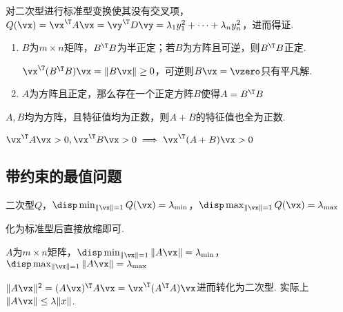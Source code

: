 \begin{analysis}
对二次型进行标准型变换使其没有交叉项，$Q(\vx)=\vx^\T A\vx=\vy^\T D\vy=\lambda_1y_1^2+\cdots+\lambda_ny_n^2$，进而得证.
\end{analysis}
\begin{proposition}
\begin{enumerate}
\itemsep -3pt
\item $B$为$m\times n$矩阵，$B^\T B$为半正定；若$B$为方阵且可逆，则$B^\T B$正定.
\begin{analysis}
$\vx^\T (B^\T B)\vx=\|B\vx\|\geq 0$，可逆则$B\vx=\vzero$只有平凡解.
\end{analysis}
\item $A$为方阵且正定，那么存在一个正定方阵$B$使得$A=B^\T B$
\end{enumerate}
\end{proposition}
\begin{proposition}
$A,B$均为方阵，且特征值均为正数，则$A+B$的特征值也全为正数.
\end{proposition}
\begin{analysis}
$\vx^\T A\vx>0,\vx^\T B\vx>0\implies\vx^\T (A+B)\vx>0$
\end{analysis}

\subsection{带约束的最值问题}
\begin{theorem}
二次型$Q$，$\disp\min_{\|\vx\|=1}Q(\vx)=\lambda_{\min}$，$\disp\max_{\|\vx\|=1}Q(\vx)=\lambda_{\max}$
\end{theorem}
\begin{analysis}
化为标准型后直接放缩即可.
\end{analysis}
\begin{theorem}
$A$为$m\times n$矩阵，$\disp\min_{\|\vx\|=1}\|A\vx\|=\lambda_{\min}$，$\disp\max_{\|\vx\|=1}\|A\vx\|=\lambda_{\max}$
\end{theorem}
\begin{analysis}
$\|A\vx\|^2=(A\vx)^\T A\vx=\vx^\T (A^\T A)\vx$进而转化为二次型. 实际上$\|A\vx\|\leq\lambda\|x\|$.
\end{analysis}